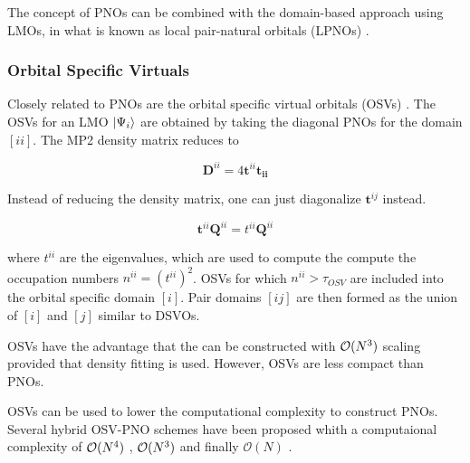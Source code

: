 The concept of PNOs can be combined with the domain-based approach using LMOs, in what is known as local pair-natural orbitals (LPNOs) \cite{Rip2013}. 



\subsubsection*{Orbital Specific Virtuals}

Closely related to PNOs are the orbital specific virtual orbitals (OSVs) \cite{Yan2011}. The OSVs for an LMO $\ket{\Psi_i}$ are obtained by taking the diagonal PNOs for the domain $[ii]$. The MP2 density matrix reduces to

\begin{equation}
\mathbf{D}^{ii} = 4 \mathbf{t}^{ii} \mathbf{t_{ii}}
\end{equation}

Instead of reducing the density matrix, one can just diagonalize $\mathbf{t}^{ij}$ instead. 

\begin{equation}
\mathbf{t}^{ii} \mathbf{Q}^{ii} = t^{ii} \mathbf{Q}^{ii}
\end{equation}

\noindent where $t^{ii}$ are the eigenvalues, which are used to compute the compute the occupation numbers $n^{ii} = \left( t^{ii} \right)^2$. OSVs for which $n^{ii} > \tau_{OSV}$ are included into the orbital specific domain $[i]$. Pair domains $[ij]$ are then formed as the union of $[i]$ and $[j]$ similar to DSVOs. 

OSVs have the advantage that the can be constructed with $\mathcal{O}(N^{3})$ scaling provided that density fitting is used. However, OSVs are less compact than PNOs.

OSVs can be used to lower the computational complexity to construct PNOs. Several hybrid OSV-PNO schemes have been proposed whith a computaional complexity of $\mathcal{O}(N^{4})$ \cite{Kra2012}, $\mathcal{O}(N^{3})$ \cite{Sch2013} and finally $\mathcal{O}(N)$ \cite{Rip2013}.




